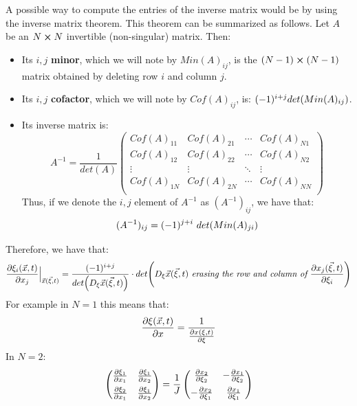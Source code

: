\documentclass[11pt, a4paper]{article} %
\begin{document}
A possible way to compute the entries of the inverse matrix would be by using the inverse matrix theorem. This theorem can be summarized as follows. Let $A$ be an $N\cross N$ invertible (non-singular) matrix. Then:
\begin{itemize}
\item Its $i,j$ {\bf minor}, which we will note by $Min(A)_{ij}$, is the $(N-1)\cross (N-1)$ matrix obtained by deleting row $i$ and column $j$.
\item Its $i,j$ {\bf cofactor}, which we will note by $Cof(A)_{ij}$, is: $(-1)^{i+j}det\qty(Min(A)_{ij})$.
\item Its inverse matrix is:
\begin{equation}
A^{-1}=\frac{1}{det(A)} \begin{pmatrix}
Cof(A)_{11} & Cof(A)_{21}&\cdots& Cof(A)_{N1}\\
Cof(A)_{12} & Cof(A)_{22}&\cdots& Cof(A)_{N2}\\
\vdots & \vdots & \ddots & \vdots \\
Cof(A)_{1N} & Cof(A)_{2N}&\cdots& Cof(A)_{NN}\\
\end{pmatrix}
\end{equation}
Thus, if we denote the $i,j$ element of $A^{-1}$ as $(A^{-1})_{ij}$, we have that:
\begin{equation}
(A^{-1})_{ij} = (-1)^{j+i}\ det\qty(Min(A)_{ji} )
\end{equation}
\end{itemize}
Therefore, we have that:
\begin{equation}\label{JacobChange}
\pdv{\xi_i(\vec{x},t)}{x_j}\Big\rvert_{\vec{x}(\vec{\xi},t)} = \frac{ (-1)^{i+j}}{det \qty(D_{\xi} \vec{x}(\vec{\xi},t))}\cdot det \qty(D_{\xi} \vec{x}(\vec{\xi},t)\textit{ erasing the row and column of }\pdv{x_j(\vec{\xi},t)}{\xi_i} )
\end{equation}
For example in $N=1$ this means that:
\begin{equation}
\pdv{\xi(\vec{x},t)}{x}=\frac{1}{\pdv{x(\xi,t)}{\xi}}
\end{equation}
In $N=2$:
\begin{equation}
\begin{pmatrix}
\pdv{\xi_1}{x_1} & \pdv{\xi_1}{x_2} \vspace{0.15cm}\\
\pdv{\xi_2}{x_1} & \pdv{\xi_1}{x_2}
\end{pmatrix}= \frac{1}{J} \begin{pmatrix}
\pdv{x_2}{\xi_2} & - \pdv{x_1}{\xi_2} \vspace{0.15cm}\\
-\pdv{x_2}{\xi_1} & \pdv{x_1}{\xi_1
} 
\end{pmatrix}
\end{equation}
\end{document}
